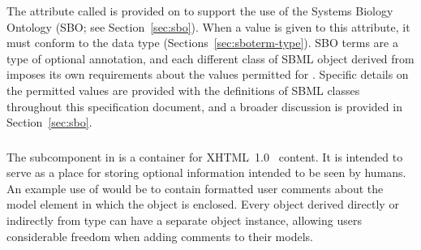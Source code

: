The attribute called  is provided on \SBase to
support the use of the Systems Biology Ontology (SBO; see
Section~\ref{sec:sbo}).  When a value is given to this attribute,
it must conform to the data type 
(Sections~\ref{sec:sboterm-type}).  SBO terms are a type of
optional annotation, and each different class of SBML object
derived from \SBase imposes its own requirements about the values
permitted for .  Specific details on the permitted
values are provided with the definitions of SBML classes
throughout this specification document, and a broader discussion
is provided in Section~\ref{sec:sbo}.


\subsubsection{}
\label{sec:notes}

The subcomponent \Notes in \SBase is a container for
XHTML~1.0~\citep{pemberton:2002} content.  It is intended to serve
as a place for storing optional information intended to be seen by
humans.  An example use of \Notes would be to contain formatted
user comments about the model element in which the \Notes object
is enclosed.  Every object derived directly or indirectly from
type \SBase can have a separate \Notes object instance, allowing
users considerable freedom when adding comments to their models.


